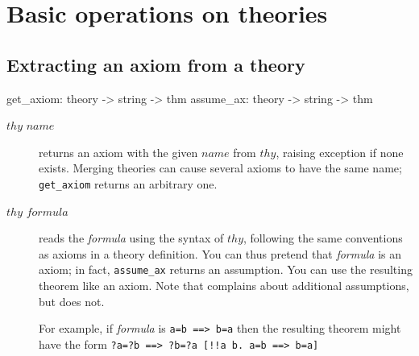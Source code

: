 \section{Basic operations on theories}
\subsection{Extracting an axiom from a theory}
\begin{ttbox} 
get_axiom: theory -> string -> thm
assume_ax: theory -> string -> thm
\end{ttbox}
\begin{description}
\item[ $thy$ $name$] 
returns an axiom with the given $name$ from $thy$, raising exception
 if none exists.  Merging theories can cause several axioms
to have the same name; {\tt get_axiom} returns an arbitrary one.

\item[ $thy$ $formula$] 
reads the {\it formula} using the syntax of $thy$, following the same
conventions as axioms in a theory definition.  You can thus pretend that
{\it formula} is an axiom; in fact, {\tt assume_ax} returns an assumption.
You can use the resulting theorem like an axiom.  Note that 
 complains about additional assumptions, but 
 does not.

For example, if {\it formula} is
\hbox{\tt a=b ==> b=a} then the resulting theorem might have the form
\hbox{\tt\frenchspacing ?a=?b ==> ?b=?a  [!!a b. a=b ==> b=a]}
\end{description}

